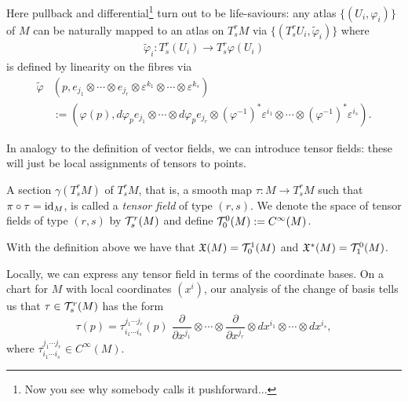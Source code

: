 Here pullback and differential\footnote{Now you see why somebody calls it pushforward...} turn out to be life-saviours:
any atlas $\{(U_i, \varphi_i)\}$ of $M$ can be naturally mapped to an atlas  on $T_s^r M$ via $\{(T_s^r U_i, \widetilde\varphi_i)\}$ where
\begin{align}
  \widetilde\varphi_i : T_s^r(U_i) \to T_s^r\varphi(U_i)
\end{align}
is defined by linearity on the fibres via
\begin{align}
  \widetilde\varphi&(p, e_{j_1}\otimes\cdots\otimes e_{j_r}\otimes \varepsilon^{k_1}\otimes \cdots\otimes \varepsilon^{k_s})\\
  &:=(\varphi(p), d\varphi_p e_{j_1}\otimes\cdots\otimes d\varphi_p e_{j_r}\otimes (\varphi^{-1})^*\varepsilon^{i_1}\otimes \cdots\otimes (\varphi^{-1})^*\varepsilon^{i_s}).
\end{align}

In analogy to the definition of vector fields, we can introduce tensor fields: these will just be local assignments of tensors to points.

\begin{definition}
  A section $\gamma(T_s^r M)$ of $T_s^r M$, that is, a smooth map $\tau : M \to T_s^r M$ such that $\pi\circ \tau = \operatorname{id}_M$, is called a \emph{tensor field} of type $(r,s)$.
  We denote the space of tensor fields of type $(r,s)$ by $\mathcal{T}_s^r(M)$ and define $\mathcal{T}_0^0(M) := C^\infty(M)$.
\end{definition}

\begin{example}
  With the definition above we have that $\mathfrak{X}(M) = \mathcal{T}_0^1(M)$ and $\mathfrak{X}^*(M) = \mathcal{T}_1^0(M)$.
\end{example}

Locally, we can express any tensor field in terms of the coordinate bases.
On a chart for $M$ with local coordinates $(x^i)$, our analysis of the change of basis tells us that $\tau\in\mathcal{T}_s^r(M)$ has the form
\begin{equation}
  \tau(p) = \tau^{j_1\cdots j_r}_{i_1\cdots i_s}(p)\; \frac{\partial}{\partial x^{j_1}}\otimes\cdots\otimes\frac{\partial}{\partial x^{j_r}}\otimes dx^{i_1}\otimes\cdots\otimes dx^{i_s},
\end{equation}
where $\tau^{j_1\cdots j_r}_{i_1\cdots i_s}\in C^\infty(M)$.

